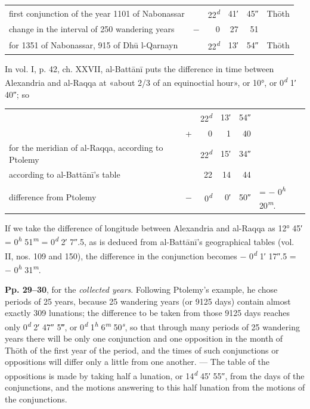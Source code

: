 \documentclass[11pt]{article}
\begin{document}
\begin{center}\small\begin{tabular}{lrrrrl}
first conjunction of the year 1101 of Nabonassar &  & 22\textsuperscript{\itshape d} & 41′ & 45″ & Thōth \\
change in the interval of 250 wandering years & − & 0 & 27 & 51 &  \\
\midrule
for 1351 of Nabonassar, 915 of Dhū l-Qarnayn &  & 22\textsuperscript{\itshape d} & 13′ & 54″ & Thōth \\
\end{tabular}\end{center}
\par In vol. I, p. 42, ch. XXVII, al-Battānī puts the difference in time between Alexandria and al-Raqqa at «about 2/3 of an equinoctial hour», or 10°, or 0\textsuperscript{\itshape d} 1′ 40″; so\par
\begin{center}\small\begin{tabular}{lrrrrl}
 &  & 22\textsuperscript{\itshape d} & 13′ & 54″ &  \\
 & + & 0 & 1 & 40 &  \\
\midrule
for the meridian of al-Raqqa, according to Ptolemy &  & 22\textsuperscript{\itshape d} & 15′ & 34″ &  \\
according to al-Battānī's table &  & 22 & 14 & 44 &  \\
\midrule
difference from Ptolemy & − & 0\textsuperscript{\itshape d} & 0′ & 50″ & = − 0\textsuperscript{\itshape h} 20\textsuperscript{\itshape m}. \\
\end{tabular}\end{center}
\par If we take the difference of longitude between Alexandria and al-Raqqa as 12° 45′ = 0\textsuperscript{\itshape h} 51\textsuperscript{\itshape m} = 0\textsuperscript{\itshape d} 2′ 7″.5, as is deduced from al-Battānī's geographical tables (vol. II, nos. 109 and 150), the difference in the conjunction becomes − 0\textsuperscript{\itshape d} 1′ 17″.5 = − 0\textsuperscript{\itshape h} 31\textsuperscript{\itshape m}.\par
\par \textbf{Pp. 29–30}, for the \emph{collected years}. Following Ptolemy's example, he chose periods of 25 years, because 25 wandering years (or 9125 days) contain almost exactly 309 lunations; the difference to be taken from those 9125 days reaches only 0\textsuperscript{\itshape d} 2′ 47″ 5‴, or 0\textsuperscript{\itshape d} 1\textsuperscript{\itshape h} 6\textsuperscript{\itshape m} 50\textsuperscript{\itshape s}, so that through many periods of 25 wandering years there will be only one conjunction and one opposition in the month of Thōth of the first year of the period, and the times of such conjunctions or oppositions will differ only a little from one another. — The table of the oppositions is made by taking half a lunation, or 14\textsuperscript{\itshape d} 45′ 55″, from the days of the conjunctions, and the motions answering to this half lunation from the motions of the conjunctions.\par
\end{document}
